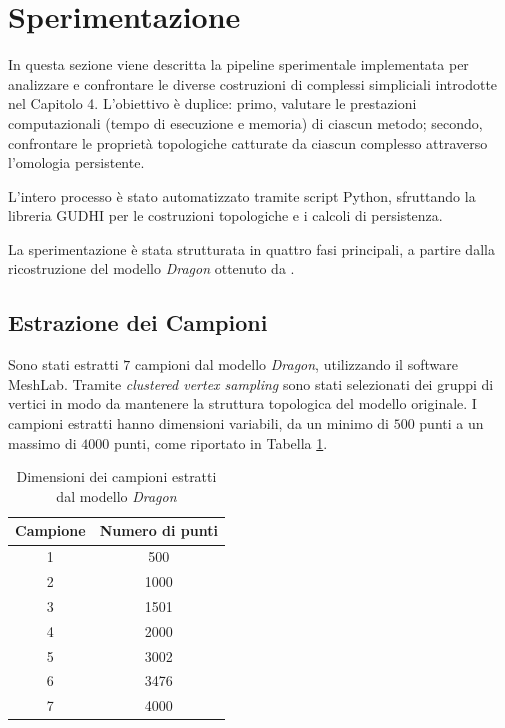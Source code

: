 \documentclass[a4paper, 12pt]{article}
\theoremstyle{definition}
\theoremstyle{remark}
\begin{document}
\section{Sperimentazione}
In questa sezione viene descritta la pipeline sperimentale implementata per analizzare e confrontare le diverse costruzioni di complessi simpliciali introdotte nel Capitolo 4. L'obiettivo è duplice: primo, valutare le prestazioni computazionali (tempo di esecuzione e memoria) di ciascun metodo; secondo, confrontare le proprietà topologiche catturate da ciascun complesso attraverso l'omologia persistente.

L'intero processo è stato automatizzato tramite script Python, sfruttando la libreria GUDHI per le costruzioni topologiche e i calcoli di persistenza.

La sperimentazione è stata strutturata in quattro fasi principali, a partire dalla ricostruzione del modello \textit{Dragon} ottenuto da \cite{StanfordRepository}.

\subsection{Estrazione dei Campioni}
Sono stati estratti $7$ campioni dal modello \textit{Dragon}, utilizzando il software MeshLab. Tramite \textit{clustered vertex sampling} sono stati selezionati dei gruppi di vertici in modo da mantenere la struttura topologica del modello originale. I campioni estratti hanno dimensioni variabili, da un minimo di $500$ punti a un massimo di $4000$ punti, come riportato in Tabella \ref{tab:campioni}.

\begin{table}[!ht]
    \centering
    \begin{tabular}{|c|c|}
        \hline
        \textbf{Campione} & \textbf{Numero di punti} \\
        \hline
        1 & 500 \\
        2 & 1000 \\
        3 & 1501 \\
        4 & 2000 \\
        5 & 3002 \\
        6 & 3476 \\
        7 & 4000 \\
        \hline
    \end{tabular}
    \caption{Dimensioni dei campioni estratti dal modello \textit{Dragon}}
    \label{tab:campioni}
\end{table}
\end{document}
